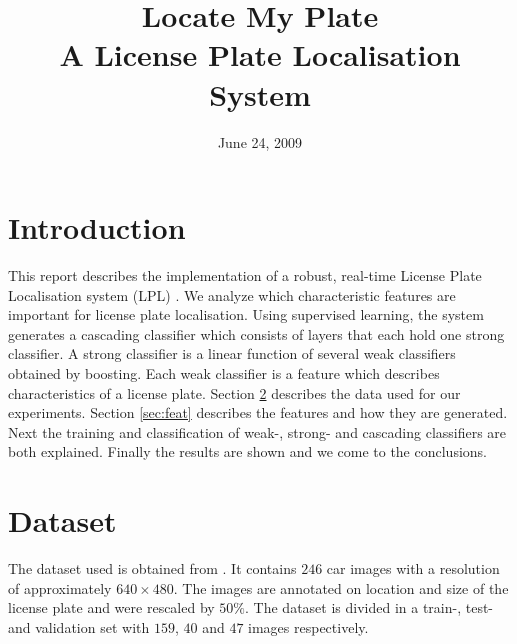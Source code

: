 \documentclass[a4paper,11pt]{article}
\title{Locate My Plate \\ A License Plate Localisation System}
\date{June 24, 2009}
\begin{document}
\maketitle
\section{Introduction}
This report describes the implementation of a robust, real-time License Plate
Localisation system (LPL) \cite{dlagnekov_thesis, zhang}. We analyze which
characteristic features are important for license plate localisation. Using
supervised learning, the system generates a cascading classifier which consists
of layers that each hold one strong classifier. A strong classifier is a linear
function of several weak classifiers obtained by boosting. Each weak classifier
is a feature which describes characteristics of a license plate. Section
\ref{sec:data} describes the data used for our experiments. Section
\ref{sec:feat} describes the features and how they are generated. Next the
training and classification of weak-, strong- and cascading classifiers are
both explained. Finally the results are shown and we come to the conclusions.

\section{Dataset} \label{sec:data}
The dataset used is obtained from \cite{dlagnekov_dataset}. It contains $246$
car images with a resolution of approximately $640\times480$. The images are
annotated on location and size of the license plate and were rescaled by
$50\%$. The dataset is divided in a train-, test- and validation set with
$159$, $40$ and $47$ images respectively.
\end{document}
